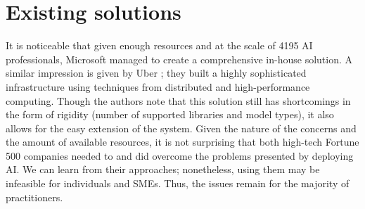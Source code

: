 \section{Existing solutions} \label{section:existing}

It is noticeable that given enough resources and at the scale of 4195 AI professionals, Microsoft managed to create a comprehensive in-house solution. A similar impression is given by Uber \cite{li2017scaling}; they built a highly sophisticated infrastructure using techniques from distributed and high-performance computing. Though the authors note that this solution still has shortcomings in the form of rigidity (number of supported libraries and model types), it also allows for the easy extension of the system. Given the nature of the concerns and the amount of available resources, it is not surprising that both high-tech Fortune 500 companies needed to and did overcome the problems presented by deploying AI. We can learn from their approaches; nonetheless, using them may be infeasible for individuals and SMEs. Thus, the issues remain for the majority of practitioners. 

